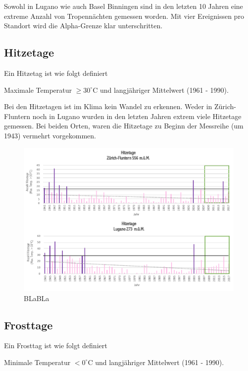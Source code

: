\begin{refsection}
Sowohl in Lugano wie auch Basel Binningen sind in den letzten 10 Jahren eine extreme Anzahl von Tropennächten gemessen worden. Mit vier Ereignissen pro Standort wird die Alpha-Grenze klar unterschritten.


\subsection{Hitzetage} \label{Hitzetage}

Ein Hitzetag ist wie folgt definiert

\begin{definition}
Maximale Temperatur $\ge 30^{\circ}$C und langjähriger Mittelwert (1961 - 1990).
\end{definition}


Bei den Hitzetagen ist im Klima kein Wandel zu erkennen. Weder in Zürich-Fluntern noch in Lugano wurden in den letzten Jahren extrem viele Hitzetage gemessen. Bei beiden Orten, waren die Hitzetage zu Beginn der Messreihe (um 1943) vermehrt vorgekommen.

\begin{figure}[htbp]
\centering
\includegraphics[width=1.0\textwidth]{extrem/Hitzetage.pdf}
\caption{BLaBLa}
\label{Hitzetage}
\end{figure}



\subsection{Frosttage}
Ein Frosttag ist wie folgt definiert

\begin{definition}
Minimale Temperatur $< 0^{\circ}$C und langjähriger Mittelwert (1961 - 1990).
\end{definition}




\end{refsection}

